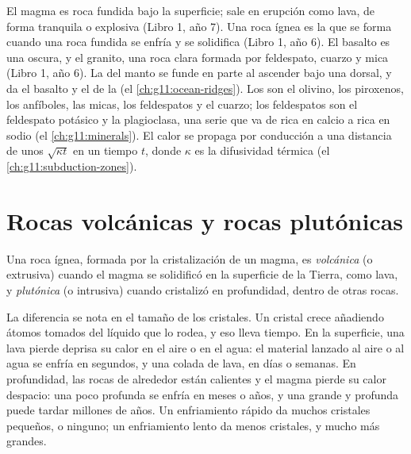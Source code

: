 \begin{recall}
El magma es roca fundida bajo la superficie; sale en erupción como lava, de
forma tranquila o explosiva (Libro 1, año 7). Una roca ígnea es la que se
forma cuando una roca fundida se enfría y se solidifica (Libro 1, año 6). El basalto es una  oscura, y el granito, una
roca clara formada por feldespato, cuarzo y mica (Libro 1, año 6). La
 del manto se funde en parte al ascender bajo una dorsal, y da el
basalto y el  de la  (el \cref{ch:g11:ocean-ridges}). Los
 son el olivino, los piroxenos, los anfíboles,
las micas, los feldespatos y el cuarzo; los feldespatos son el feldespato
potásico y la plagioclasa, una serie que va de rica en calcio a rica en sodio
(el \cref{ch:g11:minerals}). El calor se propaga por conducción a una
distancia de unos $\sqrt{\kappa t}$ en un tiempo $t$, donde $\kappa$ es la
difusividad térmica (el \cref{ch:g11:subduction-zones}).
\end{recall}

\section{Rocas volcánicas y rocas plutónicas}

\begin{definition}\label{def:g11:igneous-rocks:volcanic-plutonic}
Una roca ígnea, formada por la cristalización de un magma, es
\emph{volcánica}
(o extrusiva) cuando el magma se solidificó en la superficie de la Tierra,
como lava, y \emph{plutónica} (o intrusiva) cuando
cristalizó en profundidad, dentro de otras rocas.
\end{definition}

La diferencia se nota en el tamaño de los cristales. Un cristal crece
añadiendo átomos tomados del líquido que lo rodea, y eso lleva tiempo. En la
superficie, una lava pierde deprisa su calor en el aire o en el agua: el
material lanzado al aire o al agua se enfría en segundos, y una colada de lava,
en días o semanas. En profundidad, las rocas de alrededor están calientes y el
magma pierde su calor despacio: una  poco profunda se enfría en
meses o años, y una grande y profunda puede tardar millones de años. Un
enfriamiento rápido da muchos cristales pequeños, o ninguno; un enfriamiento
lento da menos cristales, y mucho más grandes.

